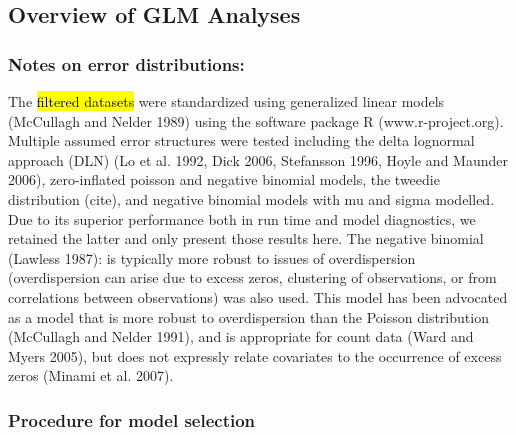 \documentclass{SCreport}
\begin{document}
\subsection{Overview of GLM Analyses}
\subsubsection{Notes on error distributions:} 

The \hl{ filtered datasets} were standardized using generalized linear models (McCullagh and Nelder 1989) using the software package R (www.r-project.org). Multiple assumed error structures were tested including the delta lognormal approach (DLN) (Lo et al. 1992, Dick 2006, Stefansson 1996, Hoyle and Maunder 2006), zero-inflated poisson and negative binomial models, the tweedie distribution (cite), and negative binomial models with mu and sigma modelled. Due to its superior performance both in run time and model diagnostics, we retained the latter and only present those results here.
	   The negative binomial (Lawless 1987): is typically more robust to issues of overdispersion (overdispersion can arise due to excess zeros, clustering of observations, or from correlations between observations) was also used. This model has been advocated as a model that is more robust to overdispersion than the Poisson distribution (McCullagh and Nelder 1991), and is appropriate for count data (Ward and Myers  2005), but does not expressly relate covariates to the occurrence of excess zeros (Minami et al. 2007).

\subsubsection{Procedure for model selection}
\end{document}
